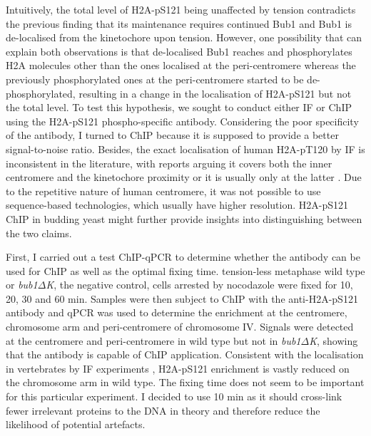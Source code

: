 Intuitively, the total level of H2A-pS121 being unaffected by tension contradicts the previous finding that its maintenance requires continued Bub1 and Bub1 is de-localised from the kinetochore upon tension. However, one possibility that can explain both observations is that de-localised Bub1 reaches and phosphorylates H2A molecules other than the ones localised at the peri-centromere whereas the previously phosphorylated ones at the peri-centromere started to be de-phosphorylated, resulting in a change in the localisation of H2A-pS121 but not the total level. To test this hypothesis, we sought to conduct either IF or ChIP using the H2A-pS121 phospho-specific antibody. Considering the poor specificity of the antibody, I turned to ChIP because it is supposed to provide a better signal-to-noise ratio. Besides, the exact localisation of human H2A-pT120 by IF is inconsistent in the literature, with reports arguing it covers both the inner centromere and the kinetochore proximity \citep{Yamagishi2010} or it is usually only at the latter \citep{Liu2013}. Due to the repetitive nature of human centromere, it was not possible to use sequence-based technologies, which usually have higher resolution. H2A-pS121 ChIP in budding yeast might further provide insights into distinguishing between the two claims. 

First, I carried out a test ChIP-qPCR to determine whether the antibody can be used for ChIP as well as the optimal fixing time. tension-less metaphase wild type or \textit{bub1$\Delta$K}, the negative control, cells arrested by nocodazole were fixed for 10, 20, 30 and 60 \si{\minute}. Samples were then subject to ChIP with the anti-H2A-pS121 antibody and qPCR was used to determine the enrichment at the centromere, chromosome arm and peri-centromere of chromosome IV. Signals were detected at the centromere and peri-centromere in wild type but not in \textit{bub1$\Delta$K}, showing that the antibody is capable of ChIP application. Consistent with the localisation in vertebrates by IF experiments \citep{Ricke2012, Kawashima2010a, Liu2013a, Williams2017Bub1Kinetochores, Zhang2020FunctioningMitosis, Liang2019ACells, Lee2008, Liu2015}, H2A-pS121 enrichment is vastly reduced on the chromosome arm in wild type. The fixing time does not seem to be important for this particular experiment. I decided to use 10 \si{\minute} as it should cross-link fewer irrelevant proteins to the DNA in theory and therefore reduce the likelihood of potential artefacts. 

